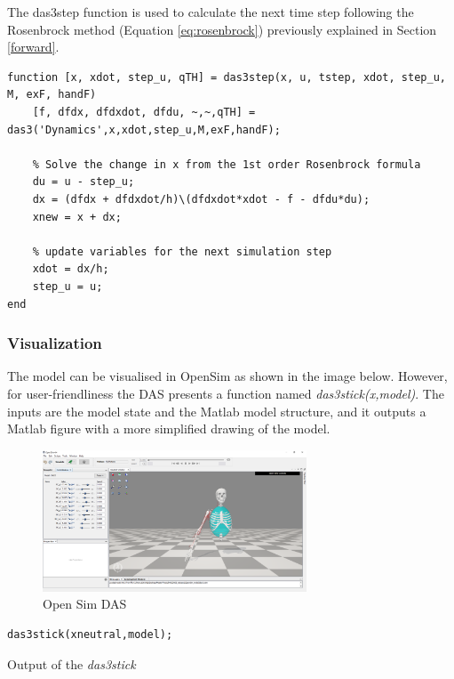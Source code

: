 The das3step function is used to calculate the next time step following the Rosenbrock method (Equation \ref{eq:rosenbrock}) previously explained in Section \ref{forward}.

\begin{lstlisting}[style=Matlab-editor]
function [x, xdot, step_u, qTH] = das3step(x, u, tstep, xdot, step_u, M, exF, handF)
    [f, dfdx, dfdxdot, dfdu, ~,~,qTH] = das3('Dynamics',x,xdot,step_u,M,exF,handF);
    
	% Solve the change in x from the 1st order Rosenbrock formula
	du = u - step_u;
	dx = (dfdx + dfdxdot/h)\(dfdxdot*xdot - f - dfdu*du);
	xnew = x + dx;
	
	% update variables for the next simulation step
	xdot = dx/h;
	step_u = u;
end
\end{lstlisting}\label{matlab:das3step}


\subsubsection{Visualization}

The model can be visualised in OpenSim as shown in the image below. However, for user-friendliness the DAS presents a function named \textit{das3stick(x,model)}. The inputs are the model state and the Matlab model structure, and it outputs a Matlab figure with a more simplified drawing of the model. 
\begin{figure}[h]
    \centering
    \includegraphics[width=0.7\textwidth]{Pictures/DAS/OpenSimModel.png}
    \caption{Open Sim DAS}
    \label{fig:OpenSimDAS}
\end{figure}

\begin{lstlisting}[style=Matlab-editor]
das3stick(xneutral,model);
 \end{lstlisting}

 Output of the \textit{das3stick}

